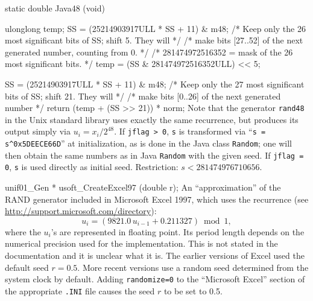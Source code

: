 static double Java48 (void) {
   ulonglong temp;
   SS = (25214903917ULL * SS + 11) \& m48;
   /* Keep only the 26 most significant bits of SS; shift 5.  They will */
   /* make bits [27..52] of the next generated number, counting from 0. */
   /* 281474972516352 = mask of the 26 most significant bits. */
   temp = (SS \& 281474972516352ULL) << 5;

   SS = (25214903917ULL * SS + 11) \& m48;
   /* Keep only the 27 most significant bits of SS; shift 21. They will */
   /* make bits [0..26] of the next generated number */
   return (temp + (SS >> 21)) * norm;
\fi  %
 Note that the generator {\tt rand48} in the Unix standard library
 uses exactly the same recurrence, but produces its output simply
 via $u_i = x_i / 2^{48}$. 
 If {\tt jflag > 0}, {\tt s} is transformed via
 ``{\tt s = s\^{}0x5DEECE66D}'' at initialization, as is done in the
 Java class {\tt Random}; one will then obtain the same numbers as
 in Java {\tt Random} with the given seed.
 If {\tt jflag = 0}, {\tt s} is used directly as initial seed.
 Restriction: $s < 281474976710656$.
  \endtab
\hide  %
\code

unif01_Gen * usoft_CreateExcel97 (double r);
\endcode
  \tab  
  An ``approximation'' of the {RAND} generator included in
  Microsoft Excel 1997, which uses the recurrence
  (see \url{http://support.microsoft.com/directory}):
$$
   u_{i}  = (9821.0\, u_{i-1} + 0.211327) \bmod 1,
$$
  where the $u_i$'s are represented in floating point.
  Its period length depends on the numerical precision used for the 
  implementation.  This is not stated in the documentation
  and it is unclear what it is.
  The earlier versions of  Excel used the default seed $r = 0.5$. 
  More recent versions use a random seed determined from the 
  system clock by default.
  Adding {\tt randomize=0} to the ``Microsoft Excel'' section of the
  appropriate {\tt .INI} file causes the seed $r$ to be set to 0.5.
  \endtab
\endhide  %
\code


}
